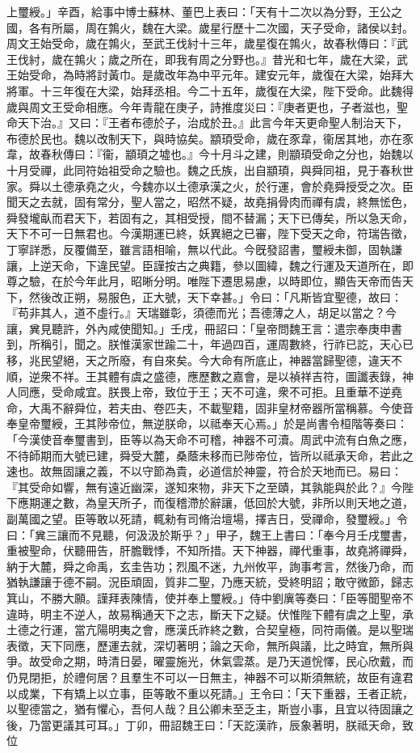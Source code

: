 \begin{pinyinscope}
上璽綬。」辛酉，給事中博士蘇林、董巴上表曰：「天有十二次以為分野，王公之國，各有所屬，周在鶉火，魏在大梁。歲星行歷十二次國，天子受命，諸侯以封。周文王始受命，歲在鶉火，至武王伐紂十三年，歲星復在鶉火，故春秋傳曰：『武王伐紂，歲在鶉火；歲之所在，即我有周之分野也。』昔光和七年，歲在大梁，武王始受命，為時將討黃巾。是歲改年為中平元年。建安元年，歲復在大梁，始拜大將軍。十三年復在大梁，始拜丞相。今二十五年，歲復在大梁，陛下受命。此魏得歲與周文王受命相應。今年青龍在庚子，詩推度災曰：『庚者更也，子者滋也，聖命天下治。』又曰：『王者布德於子，治成於丑。』此言今年天更命聖人制治天下，布德於民也。魏以改制天下，與時協矣。顓頊受命，歲在豕韋，衞居其地，亦在豕韋，故春秋傳曰：『衞，顓頊之墟也。』今十月斗之建，則顓頊受命之分也，始魏以十月受禪，此同符始祖受命之驗也。魏之氏族，出自顓頊，與舜同祖，見于春秋世家。舜以土德承堯之火，今魏亦以土德承漢之火，於行運，會於堯舜授受之次。臣聞天之去就，固有常分，聖人當之，昭然不疑，故堯捐骨肉而禪有虞，終無恡色，舜發壠畒而君天下，若固有之，其相受授，間不替漏；天下已傳矣，所以急天命，天下不可一日無君也。今漢期運已終，妖異絕之已審，陛下受天之命，符瑞告徵，丁寧詳悉，反覆備至，雖言語相喻，無以代此。今旣發詔書，璽綬未御，固執謙讓，上逆天命，下違民望。臣謹按古之典籍，參以圖緯，魏之行運及天道所在，即尊之驗，在於今年此月，昭晰分明。唯陛下遷思易慮，以時即位，顯告天帝而告天下，然後改正朔，易服色，正大號，天下幸甚。」令曰：「凡斯皆宜聖德，故曰：『苟非其人，道不虛行。』天瑞雖彰，須德而光；吾德薄之人，胡足以當之？今讓，兾見聽許，外內咸使聞知。」壬戌，冊詔曰：「皇帝問魏王言：遣宗奉庚申書到，所稱引，聞之。朕惟漢家世踰二十，年過四百，運周數終，行祚已訖，天心已移，兆民望絕，天之所廢，有自來矣。今大命有所底止，神器當歸聖德，違天不順，逆衆不祥。王其體有虞之盛德，應歷數之嘉會，是以禎祥吉符，圖讖表錄，神人同應，受命咸宜。朕畏上帝，致位于王；天不可違，衆不可拒。且重華不逆堯命，大禹不辭舜位，若夫由、卷匹夫，不載聖籍，固非皇材帝器所當稱慕。今使音奉皇帝璽綬，王其陟帝位，無逆朕命，以祗奉天心焉。」於是尚書令桓階等奏曰：「今漢使音奉璽書到，臣等以為天命不可稽，神器不可瀆。周武中流有白魚之應，不待師期而大號已建，舜受大麓，桑蔭未移而已陟帝位，皆所以祗承天命，若此之速也。故無固讓之義，不以守節為貴，必道信於神靈，符合於天地而已。易曰：『其受命如響，無有遠近幽深，遂知來物，非天下之至賾，其孰能與於此？』今陛下應期運之數，為皇天所子，而復稽滯於辭讓，低回於大號，非所以則天地之道，副萬國之望。臣等敢以死請，輒勑有司脩治壇場，擇吉日，受禪命，發璽綬。」令曰：「兾三讓而不見聽，何汲汲於斯乎？」甲子，魏王上書曰：「奉今月壬戌璽書，重被聖命，伏聽冊告，肝膽戰悸，不知所措。天下神器，禪代重事，故堯將禪舜，納于大麓，舜之命禹，玄圭告功；烈風不迷，九州攸平，詢事考言，然後乃命，而猶執謙讓于德不嗣。況臣頑固，質非二聖，乃應天統，受終明詔；敢守微節，歸志箕山，不勝大願。謹拜表陳情，使并奉上璽綬。」侍中劉廙等奏曰：「臣等聞聖帝不違時，明主不逆人，故易稱通天下之志，斷天下之疑。伏惟陛下體有虞之上聖，承土德之行運，當亢陽明夷之會，應漢氏祚終之數，合契皇極，同符兩儀。是以聖瑞表徵，天下同應，歷運去就，深切著明；論之天命，無所與議，比之時宜，無所與爭。故受命之期，時清日晏，曜靈施光，休氣雲蒸。是乃天道恱懌，民心欣戴，而仍見閉拒，於禮何居？且羣生不可以一日無主，神器不可以斯須無統，故臣有違君以成業，下有矯上以立事，臣等敢不重以死請。」王令曰：「天下重器，王者正統，以聖德當之，猶有懼心，吾何人哉？且公卿未至乏主，斯豈小事，且宜以待固讓之後，乃當更議其可耳。」丁卯，冊詔魏王曰：「天訖漢祚，辰象著明，朕祗天命，致位
\end{pinyinscope}
